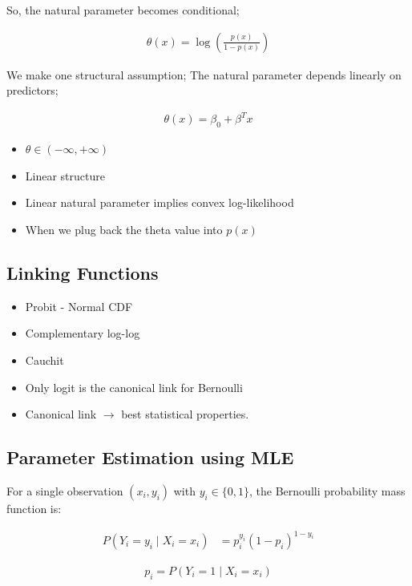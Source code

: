 \documentclass[10pt,a4paper]{article}
\begin{document}
		So, the natural parameter becomes conditional;

	\begin{align*}
			\theta(x) = \log\left(\frac{p(x)}{1-p(x)}\right)
	\end{align*}

		We make one structural assumption; The natural parameter depends linearly on predictors;

	\begin{align*}
			\theta(x) = \beta_0 + \beta^T x
	\end{align*}


	\begin{itemize}
		\item $\theta \in (-\infty,+\infty)$
		\item Linear structure
		\item Linear natural parameter implies convex log-likelihood
		\item When we plug back the theta value into $p(x)$
	\end{itemize}

	\subsection{Linking Functions}
	\begin{itemize}
		\item Probit - Normal CDF
		\item Complementary log-log
		\item Cauchit
		\item Only logit is the canonical link for Bernoulli
		\item Canonical link $\rightarrow$ best statistical properties.
	\end{itemize}

	\subsection{Parameter Estimation using MLE}

	For a single observation $(x_i, y_i)$ with $y_i \in \{0,1\}$, the Bernoulli probability mass function is:

	\begin{align*}
		P(Y_i = y_i \mid X_i = x_i)&= p_i^{y_i}(1-p_i)^{1-y_i}
	\end{align*}

	\begin{align*}
		p_i = P(Y_i=1 \mid X_i=x_i)
	\end{align*}
\end{document}
